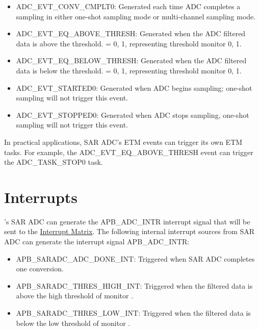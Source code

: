 \documentclass[main\_\_EN.tex]{subfiles}
\begin{document}
\begin{itemize}
    \item ADC\_EVT\_CONV\_CMPLT0: Generated each time ADC completes a sampling in either one-shot sampling mode or multi-channel sampling mode.
    \item ADC\_EVT\_EQ\_ABOVE\_THRESH: Generated when the ADC filtered data is above the threshold.  = 0, 1, representing threshold monitor 0, 1.
    \item ADC\_EVT\_EQ\_BELOW\_THRESH: Generated when the ADC filtered data is below the threshold.  = 0, 1, representing threshold monitor 0, 1.
    \item ADC\_EVT\_STARTED0: Generated when ADC begins sampling; one-shot sampling will not trigger this event.
    \item ADC\_EVT\_STOPPED0: Generated when ADC stops sampling, one-shot sampling will not trigger this event.
\end{itemize}

In practical applications, SAR ADC's ETM events can trigger its own ETM tasks. For example, the ADC\_EVT\_EQ\_ABOVE\_THRESH event can trigger the ADC\_TASK\_STOP0 task.



\section{Interrupts}
\label{sec:adc_interrupts}

\chipname{}'s SAR ADC can generate the APB\_ADC\_INTR interrupt signal that will be sent to the \hyperref[mod:intmtrx]{Interrupt Matrix}. The following internal interrupt sources from SAR ADC can generate the interrupt signal APB\_ADC\_INTR:

\begin{itemize}
    \item \label{int:SARADCDONEINT1} APB\_SARADC\_ADC\_DONE\_INT: Triggered when SAR ADC completes one conversion.
    \item \label{int:APBSARADCTHRESxHIGHINT} APB\_SARADC\_THRES\_HIGH\_INT: Triggered when the filtered data is above the high threshold of monitor .
    \item \label{int:APBSARADCTHRESxLOWINT} APB\_SARADC\_THRES\_LOW\_INT: Triggered when the filtered data is below the low threshold of monitor .
\end{itemize}
\end{document}
